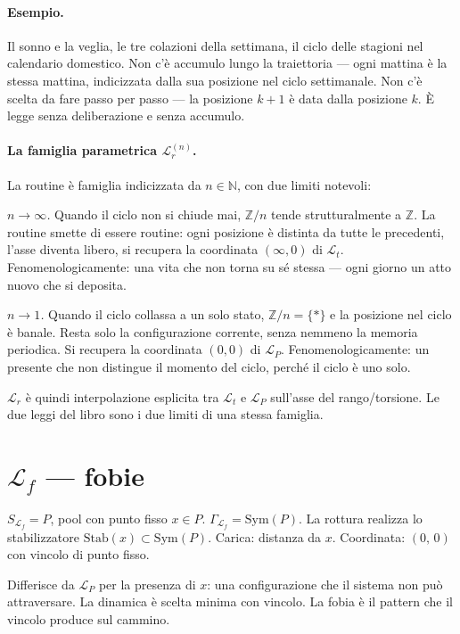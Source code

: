 \documentclass[
    oneside,                 %
    openany,                 %
    titlepage,
    11pt,
    a4paper,
    italian,
    DIV=14,                  %
    headinclude,
    footinclude=true,
    cleardoublepage=empty
]{scrbook}
\theoremstyle{ctplain}
\theoremstyle{ctdef}
\theoremstyle{ctrem}
\newcommand{\Lt}{\mathcal{L}_t}
\newcommand{\LP}{\mathcal{L}_P}
\newcommand{\Lr}{\mathcal{L}_r}
\newcommand{\Lf}{\mathcal{L}_f}
\newcommand{\Sym}{\mathrm{Sym}}
\begin{document}
\paragraph{Esempio.} Il sonno e la veglia, le tre colazioni della settimana, il ciclo delle stagioni nel calendario domestico. Non c'è accumulo lungo la traiettoria --- ogni mattina è la stessa mattina, indicizzata dalla sua posizione nel ciclo settimanale. Non c'è scelta da fare passo per passo --- la posizione $k+1$ è data dalla posizione $k$. È legge senza deliberazione e senza accumulo.

\paragraph{La famiglia parametrica $\Lr^{(n)}$.} La routine è famiglia indicizzata da $n \in \mathbb{N}$, con due limiti notevoli:

\emph{$n \to \infty$.} Quando il ciclo non si chiude mai, $\mathbb{Z}/n$ tende strutturalmente a $\mathbb{Z}$. La routine smette di essere routine: ogni posizione è distinta da tutte le precedenti, l'asse diventa libero, si recupera la coordinata $(\infty, 0)$ di $\Lt$. Fenomenologicamente: una vita che non torna su sé stessa --- ogni giorno un atto nuovo che si deposita.

\emph{$n \to 1$.} Quando il ciclo collassa a un solo stato, $\mathbb{Z}/n = \{*\}$ e la posizione nel ciclo è banale. Resta solo la configurazione corrente, senza nemmeno la memoria periodica. Si recupera la coordinata $(0, 0)$ di $\LP$. Fenomenologicamente: un presente che non distingue il momento del ciclo, perché il ciclo è uno solo.

$\Lr$ è quindi interpolazione esplicita tra $\Lt$ e $\LP$ sull'asse del rango/torsione. Le due leggi del libro sono i due limiti di una stessa famiglia.

\section*{$\Lf$ --- fobie}

$S_{\Lf} = P$, pool con punto fisso $x \in P$. $\Gamma_{\Lf} = \Sym(P)$. La rottura realizza lo stabilizzatore $\mathrm{Stab}(x) \subset \Sym(P)$. Carica: distanza da $x$. Coordinata: $(0,\,0)$ con vincolo di punto fisso.

Differisce da $\LP$ per la presenza di $x$: una configurazione che il sistema non può attraversare. La dinamica è scelta minima con vincolo. La fobia è il pattern che il vincolo produce sul cammino.
\end{document}
